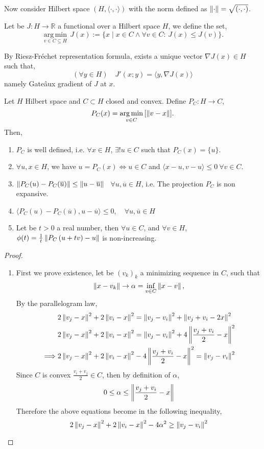 Now consider Hilbert space $(H, \langle \cdot,\cdot \rangle)$ with the norm defined as $\left\lVert\cdot\right\rVert=\sqrt{(\cdot,\cdot)}$.

Let be $J: H\rightarrow \mathbb{R}$ a functional over a Hilbert space $H$, we define the set,
\[
{\displaystyle {\underset {v\in C\subseteq H}{\operatorname {arg\,min} }}\,J(x):=\{x\mid x\in C\wedge \forall v\in C:\,J(x)\leq J(v)\}.}\]


By Riesz-Fr\'echet representation formula, exists a unique vector $\nabla J(x) \in H$ such that, 
\[
(\forall y \in H) \quad J'(x; y)=\langle y, \nabla J(x)\rangle
\]
namely Gate\^aux gradient of $J$ at $x$. 

\begin{lemma}
\label{lemma3. Projection}
Let $H$ Hilbert space and $C\subset H$ closed and convex. Define $P_C: H\rightarrow C$, \[P_C(x)={\displaystyle {\underset {v\in C}{\operatorname {arg\,min} }}\left[\left\lVert v-x\right\rVert\right]}.\]
Then,
\begin{enumerate}
	\item $P_C$ is well defined, i.e.  $\forall x \in H $, $\exists !u \in C$ such that $P_C(x)=\{u\}$.
	\item $\forall u,x\in H$, we have $u=P_C(x) \iff u\in C$  and  $\langle x-u, v-u\rangle\leq 0\ \forall v \in C$.
	\item $\left\lVert P_C(u)-P_C(\overline{u})\right\rVert\leq \left\lVert u-\overline{u}\right\rVert$ \ $\forall u, \overline{u} \in H$, i.e. The projection $P_C$ is non expansive.
	\item $\langle P_C(u)-P_C(\overline{u}), u-\overline{u}\rangle \leq 0, \quad \forall u, \overline{u}\in H$
	\item Let be $t>0$ a real number, then $\forall u \in C$, and $\forall v\in H$, $\phi(t)=\frac{1}{t}\left\lVert P_C\left(u+tv\right)-u\right\rVert$ is non-increasing.
\end{enumerate}
\begin{proof}
	\begin{enumerate}
		\item First we prove existence, let be $(v_k)_k$ a minimizing sequence in $C$, such that
		\[
			\left\lVert x-v_k\right\rVert\rightarrow \alpha=\inf_{v \in C}\left\lVert x-v\right\rVert,
		\]
		By the parallelogram law,
		\begin{align*}
			&2\left\lVert v_j-x\right\rVert^2+2\left\lVert v_i-x\right\rVert^2= \left\lVert v_j-v_i\right\rVert^2+\left\lVert v_j+v_i-2x\right\rVert^2 \\
			&2\left\lVert v_j-x\right\rVert^2+2\left\lVert v_i-x\right\rVert^2= \left\lVert v_j-v_i\right\rVert^2+4\left\lVert\frac{v_j+v_i}{2}-x\right\rVert^2\\
	\implies&2\left\lVert v_j-x\right\rVert^2+2\left\lVert v_i-x\right\rVert^2-4\left\lVert\frac{v_j+v_i}{2}-x\right\rVert^2=\left\lVert v_j-v_i\right\rVert^2
		\end{align*}
		Since $C$ is convex $\frac{v_i+v_j}{2} \in C$, then by definition of $\alpha$,
		\[
		0\leq \alpha \leq \left\lVert\frac{v_j+v_i}{2}-x\right\rVert
		\]  
		Therefore the above equations become in the following inequality,
		\[
		2\left\lVert v_j-x\right\rVert^2+2\left\lVert v_i-x\right\rVert^2-4\alpha^2\geq \left\lVert v_j-v_i\right\rVert^2
		\]
		

\end{enumerate}
\end{proof}
\end{lemma}
